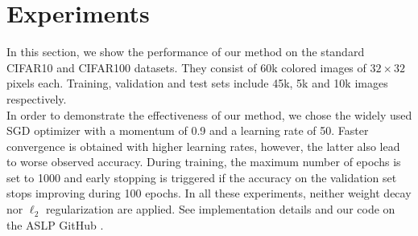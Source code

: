   \section{Experiments}\label{sec:experiments}
  
  In this section, we show the performance of our method on the standard CIFAR10
  and CIFAR100 datasets.   They consist of  60k  colored images of $32\times 32$
  pixels each.  Training,  validation and test sets  include  45k,  5k and 10k
  images respectively.  \\  In order to demonstrate the effectiveness of our
  method, we chose the widely used SGD optimizer with a momentum of  0.9  and a
  learning rate of 50.    Faster convergence is obtained with higher learning
  rates,   however,  the latter also lead  to worse observed accuracy.   During
  training,  the maximum number of epochs is set to 1000 and early stopping is
  triggered  if the accuracy on the validation set stops improving during 100
  epochs.   In all these experiments, neither weight decay nor $\ell_2$
  regularization are applied. See implementation details and our code on the ASLP GitHub
  \cite{Dupont2022}.

